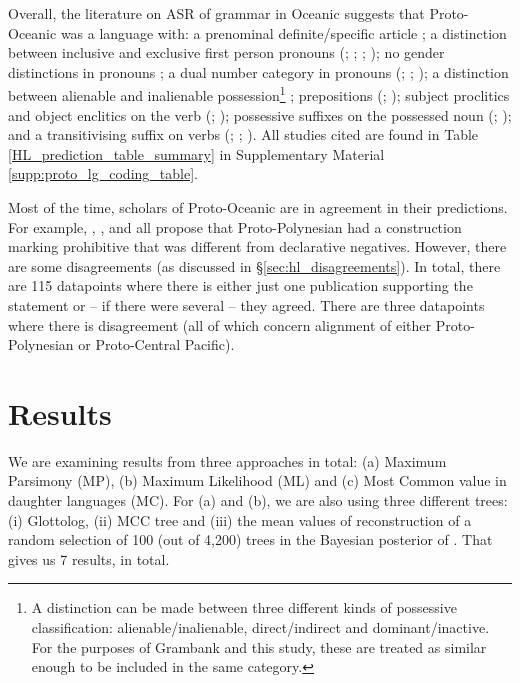 \documentclass[12pt,letterpaper]{article}
\begin{document}
Overall, the literature on ASR of grammar in Oceanic suggests that Proto-Oceanic was a language with: a prenominal definite/specific article \citep[136]{crowley1985common}; a distinction between inclusive and exclusive first person pronouns (\citealt[112]{pawley1973some}; \citealt[184]{crowley1985common}; \citealt[500]{ross2004morphosyntactic}; \citealt[67, 75]{lynchrosscrowley_proto_grammar_oceanic}); no gender distinctions in pronouns \citep[498]{ross2004morphosyntactic}; a dual number category in pronouns (\citealt[498]{ross2004morphosyntactic}; \citealt[69]{lynchrosscrowley_proto_grammar_oceanic}; \citealt[173]{pawley1973some}); a distinction between alienable and inalienable possession\footnote{A distinction can be made between three different kinds of possessive classification: alienable/inalienable, direct/indirect and dominant/inactive. For the purposes of Grambank and this study, these are treated as similar enough to be included in the same category.} \citep[69]{lynchrosscrowley_proto_grammar_oceanic}; prepositions (\citealt[167]{pawley1973some}; \citealt[498]{ross2004morphosyntactic}); subject proclitics and object enclitics on the verb (\citealt[498-499]{ross2004morphosyntactic}; \citealt[83]{lynchrosscrowley_proto_grammar_oceanic}); possessive suffixes on the possessed noun (\citealt[495]{ross2004morphosyntactic}; \citealt[155]{pawley1973some}); and a transitivising suffix on verbs (\citealt[352]{pawley1970change}; \citealt[171]{pawley1973some}; \citealt[80, 92]{lynchrosscrowley_proto_grammar_oceanic}). All studies cited are found in Table \ref{HL_prediction_table_summary} in Supplementary Material \ref{supp:proto_lg_coding_table}.

Most of the time, scholars of Proto-Oceanic are in agreement in their predictions. For example, \citet[142]{pawley1973some}, \citet[292]{ross2007two}, \citet[xiii, 125]{clark1973aspects} and \citet[89]{lynchrosscrowley_proto_grammar_oceanic} all propose that Proto-Polynesian had a construction marking prohibitive that was different from declarative negatives. However, there are some disagreements (as discussed in §\ref{sec:hl_disagreements}). In total, there are 115 datapoints where there is either just one publication supporting the statement or -- if there were several -- they agreed. There are three datapoints where there is disagreement (all of which concern alignment of either Proto-Polynesian or Proto-Central Pacific).

\FloatBarrier
\section{Results}
\label{results}
We are examining results from three approaches in total: (a) Maximum Parsimony (MP), (b) Maximum Likelihood (ML) and (c) Most Common value in daughter languages (MC). For (a) and (b), we are also using three different trees: (i) Glottolog, (ii) \citet{grayetal_2009} MCC tree and (iii) the mean values of reconstruction of a random selection of 100 (out of 4,200) trees in the Bayesian posterior of \citet{grayetal_2009}. That gives us 7 results, in total.
\end{document}

